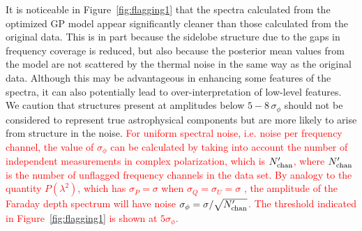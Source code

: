 \documentclass[fleqn,usenatbib]{mnras}
\begin{document}
It is noticeable in Figure~\ref{fig:flagging1} that the spectra calculated from the optimized GP model appear significantly cleaner than those calculated from the original data. This is in part because the sidelobe structure due to the gaps in frequency coverage is reduced, but also because the posterior mean values from the model are not scattered by the thermal noise in the same way as the original data. Although this may be advantageous in enhancing some features of the spectra, it can also potentially lead to over-interpretation of low-level features. We caution that structures present at amplitudes below $5-8\,\sigma_{\phi}$ should not be considered to represent true astrophysical components but are more likely to arise from structure in the noise. \textcolor{red}{For uniform spectral noise, i.e. noise per frequency channel, the value of $\sigma_{\phi}$ can be calculated by taking into account the number of independent measurements in complex polarization, which is $N_{\rm chan}'$, where $N_{\rm chan}'$ is the number of unflagged frequency channels in the data set. By analogy to the quantity $P(\lambda^2)$, which has $\sigma_P = \sigma$ when $\sigma_Q = \sigma_U = \sigma$ \citep{2005A&A...441.1217B}, the amplitude of the Faraday depth spectrum will have noise $\sigma_{\phi} = \sigma/\sqrt{N_{\rm chan}'}$. The threshold indicated in Figure~\ref{fig:flagging1} is shown at $5\sigma_{\phi}$.} 

\end{document}
